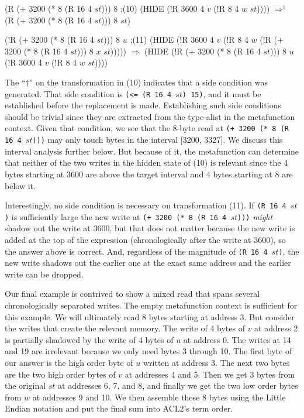 \documentclass[submission,copyright,creativecommons]{eptcs}
\newcommand{\ptt}[1]{\tt{#1}}
\begin{document}
\begin{acl2p}
(R (+ 3200 (* 8 (R 16 4 $st$))) 8                                       ;{\rm{(10)}}
   (HIDE (!R 3600 4 $v$ (!R 8 4 $w$ $st$))))
$\Longrightarrow^\dagger$
(R (+ 3200 (* 8 (R 16 4 $st$))) 8 $st$)
\end{acl2p}

\begin{acl2p}
(!R (+ 3200 (* 8 (R 16 4 $st$))) 8 $u$                                    ;{\rm{(11)}}
    (HIDE (!R 3600 4 $v$ 
              (!R 8 4 $w$
                  (!R (+ 3200 (* 8 (R 16 4 $st$))) 8 $x$
                      $st$)))))
$\Longrightarrow$
(HIDE (!R (+ 3200 (* 8 (R 16 4 $st$))) 8 $u$
          (!R 3600 4 $v$ 
              (!R 8 4 $w$ $st$))))
\end{acl2p}
The ``$\dagger$'' on the transformation in {\rm{(10)}} indicates that a side
condition was generated.  That side condition is {\ptt{(<= (R 16 4 $st$)
    15)}}, and it must be established before the replacement is made.
Establishing such side conditions should be trivial since they are extracted
from the type-alist in the metafunction context.  Given that condition, we
see that the 8-byte read at {\ptt{(+ 3200 (* 8 (R 16 4 $st$)))}} may only
touch bytes in the interval [3200, 3327].  We discuss this interval analysis
further below.  But because of it, the metafunction can determine that
neither of the two writes in the hidden state of {\rm{(10)}} is relevant since the 4
bytes starting at 3600 are above the target interval and 4 bytes starting at
8 are below it.

Interestingly, no side condition is necessary on transformation {\rm{(11)}}.  If
{\ptt{(R 16 4 $st$)}} is sufficiently large the new write at {\ptt{(+ 3200 (* 8
    (R 16 4 $st$)))}} {\em{might}} shadow out the write at 3600, but that
does not matter because the new write is added at the top of the expression
(chronologically after the write at 3600), so the answer above is correct.
And, regardless of the magnitude of {\ptt{(R 16 4 $st$)}}, the new write
shadows out the earlier one at the exact same address and the earlier write
can be dropped.

Our final example is contrived to show a mixed read that spans several
chronologically separated writes.  The empty metafunction context is
sufficient for this example.  We will ultimately read 8 bytes starting at
address 3.  But consider the writes that create the relevant memory.  The
write of 4 bytes of $v$ at address 2 is partially shadowed by the write of 4
bytes of $u$ at address 0.  The writes at 14 and 19 are irrelevant because we
only need bytes 3 through 10.  The first byte of our answer is the high
order byte of $u$ written at address 3.  The next two bytes are the two high
order bytes of $v$ at addresses 4 and 5.  Then we get 3 bytes from the original
$st$ at addresses 6, 7, and 8, and finally we get the two low order bytes
from $w$ at addresses 9 and 10.  We then assemble these 8 bytes using the
Little Endian notation and put the final sum into ACL2's term order.
\end{document}
